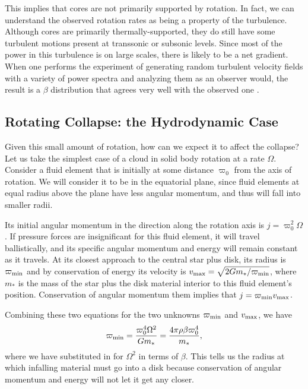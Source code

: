 This implies that cores are not primarily supported by rotation. In fact, we can understand the observed rotation rates as being a property of the turbulence. Although cores are primarily thermally-supported, they do still have some turbulent motions present at transsonic or subsonic levels. Since most of the power in this turbulence is on large scales, there is likely to be a net gradient. When one performs the experiment of generating random turbulent velocity fields with a variety of power spectra and analyzing them as an observer would, the result is a $\beta$ distribution that agrees very well with the observed one \citep{burkert00a}.

\subsection{Rotating Collapse: the Hydrodynamic Case}

Given this small amount of rotation, how can we expect it to affect the collapse? Let us take the simplest case of a cloud in solid body rotation at a rate $\Omega$. Consider a fluid element that is initially at some distance $\varpi_0$ from the axis of rotation. We will consider it to be in the equatorial plane, since fluid elements at equal radius above the plane have less angular momentum, and thus will fall into smaller radii.

Its initial angular momentum in the direction along the rotation axis is $j=\varpi_0^2\Omega$. If pressure forces are insignificant for this fluid element, it will travel ballistically, and its specific angular momentum and energy will remain constant as it travels. At its closest approach to the central star plus disk, its radius is $\varpi_{\rm min}$ and by conservation of energy its velocity is $v_{\rm max} = \sqrt{2 G m_*/\varpi_{\rm min}}$, where $m_*$ is the mass of the star plus the disk material interior to this fluid element's position.
Conservation of angular momentum them implies that $j=\varpi_{\rm min} v_{\rm max}$.

Combining these two equations for the two unknowns $\varpi_{\rm min}$ and $v_{\rm max}$, we have
\begin{equation}
\varpi_{\rm min} = \frac{\varpi_0^4 \Omega^2}{G m_*} = \frac{4\pi \rho \beta \varpi_0^4}{m_*},
\end{equation}
where we have substituted in for $\Omega^2$ in terms of $\beta$. This tells us the radius at which infalling material must go into a disk because conservation of angular momentum and energy will not let it get any closer.

